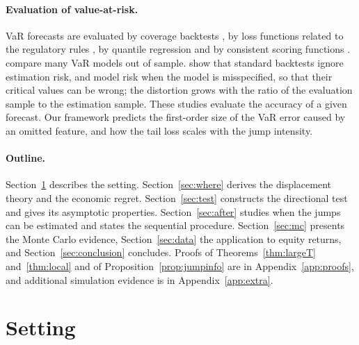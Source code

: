 \documentclass[11pt,a4paper]{article}
\theoremstyle{definition}
\theoremstyle{remark}
\begin{document}
\paragraph{Evaluation of value-at-risk.} VaR forecasts are evaluated by coverage backtests \citep{kupiec1995,christoffersen1998,christoffersen2004}, by loss functions related to the regulatory rules \citep{lopez1999}, by quantile regression \citep{gaglianone2011} and by consistent scoring functions \citep{gneiting2011}. \citet{kuester2006} compare many VaR models out of sample. \citet{escanciano2010} show that standard backtests ignore estimation risk, and model risk when the model is misspecified, so that their critical values can be wrong; the distortion grows with the ratio of the evaluation sample to the estimation sample. These studies evaluate the accuracy of a given forecast. Our framework predicts the first-order size of the VaR error caused by an omitted feature, and how the tail loss scales with the jump intensity.

\paragraph{Outline.} Section~\ref{sec:setting} describes the setting. Section~\ref{sec:where} derives the displacement theory and the economic regret. Section~\ref{sec:test} constructs the directional test and gives its asymptotic properties. Section~\ref{sec:after} studies when the jumps can be estimated and states the sequential procedure. Section~\ref{sec:mc} presents the Monte Carlo evidence, Section~\ref{sec:data} the application to equity returns, and Section~\ref{sec:conclusion} concludes. Proofs of Theorems~\ref{thm:largeT} and~\ref{thm:local} and of Proposition~\ref{prop:jumpinfo} are in Appendix~\ref{app:proofs}, and additional simulation evidence is in Appendix~\ref{app:extra}.

\section{Setting}\label{sec:setting}
\end{document}
